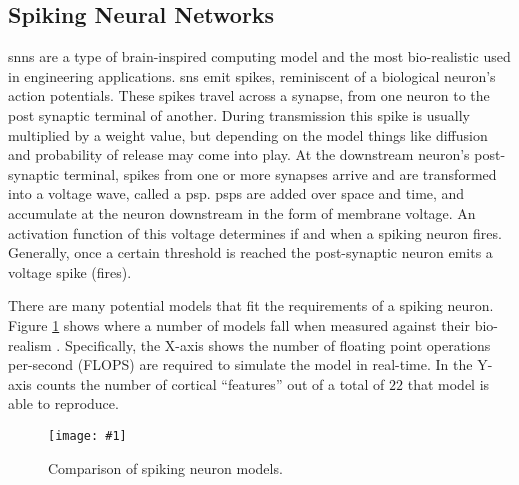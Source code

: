 \documentclass[conference]{IEEEtran}
\newcommand{\afigf}[3]{
	\begin{figure}[h]
    	\centering
		\texttt{[image: \#1]}
        \caption{#2.}
        \label{#3}
	\end{figure}
}
\begin{document}
\subsection{Spiking Neural Networks}
\Glspl{snn} are a type of brain-inspired computing model and the most
bio-realistic used in engineering applications. \Glspl{sn} emit spikes,
reminiscent of a biological neuron's action potentials. These spikes travel
across a synapse, from one neuron to the post synaptic terminal of
another. During transmission this spike is usually multiplied by a weight value,
but depending on the model things like diffusion and probability of release may
come into play. At the downstream neuron's post-synaptic terminal, spikes from
one or more synapses arrive and are transformed into a voltage wave, called a
\gls{psp}. \glspl{psp} are added over space and time, and accumulate at the
neuron downstream in the form of membrane voltage. An activation function of
this voltage determines if and when a spiking neuron fires. Generally,
once a certain threshold is reached the post-synaptic neuron emits a voltage
spike (fires).



There are many potential models that fit the requirements of a spiking
neuron. Figure \ref{fig:sn_model_compare} shows where a number of models fall
when measured against their bio-realism
\parencite{izhikevich_2004}. Specifically, the X-axis shows the number of
floating point operations per-second (FLOPS) are required to simulate the model
in real-time. In the Y-axis counts the number of cortical ``features'' out of a
total of $22$ that model is able to reproduce.
    
\afigf{figures/sn-model-compare.png}{Comparison of spiking neuron
  models}{fig:sn_model_compare}
\end{document}
